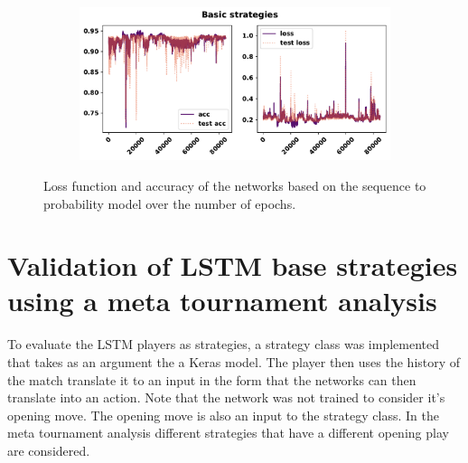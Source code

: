 \begin{figure}[!htbp]
\begin{subfigure}{\textwidth}
    \end{subfigure}
    \begin{subfigure}{\textwidth}
    \centering
    \includegraphics[width=.8\textwidth]{src/chapters/07/img/validation_plot_classification_basic_strategies.pdf}
    \end{subfigure}
    \caption{Loss function and accuracy of the networks based on the sequence to probability
    model over the number of epochs.}\label{fig:validation_sequence_to_probability}
\end{figure}



\section{Validation of LSTM base strategies using a meta tournament analysis}\label{section:rnn_strategy_validation}

To evaluate the LSTM players as strategies, a strategy class was implemented
that takes as an argument the a Keras model. The player then uses the history
of the match translate it to an input in the form that the networks can then
translate into an action. Note that the network was not trained to consider
it's opening move. The opening move is also an input to the strategy class.
In the meta tournament analysis different strategies that have a different
opening play are considered.

